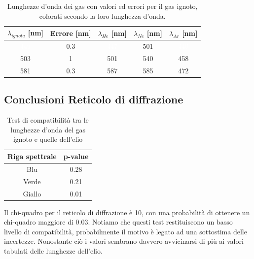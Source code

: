 \documentclass[letterpaper,12pt]{article}
\begin{document}
\begin{table}[h!]
    \centering
    \begin{tabular}{|c|c|c|c|c|}
    \hline
    \textbf{$\lambda_{ignota}$} [nm] & \textbf{Errore} [nm] & \textbf{$\lambda_{He}$} [nm] & \textbf{$\lambda_{Ne}$} [nm] & \textbf{$\lambda_{Ar}$} [nm]\\
    \hline
    \cellcolor{wavelength_449} \textcolor{white}{449} & \cellcolor{wavelength_nan}0.3 & \cellcolor{wavelength_447} \textcolor{white}{447} & \cellcolor{wavelength_501} 501 & \cellcolor{wavelength_440} \textcolor{white}{440} \\
    \hline
    \cellcolor{wavelength_503} 503 & \cellcolor{wavelength_nan}1 & \cellcolor{wavelength_501} 501 & \cellcolor{wavelength_540} 540 & \cellcolor{wavelength_458} 458 \\
    \hline
    \cellcolor{wavelength_581} 581 & \cellcolor{wavelength_nan}0.3 & \cellcolor{wavelength_587} 587 & \cellcolor{wavelength_585} 585 & \cellcolor{wavelength_472} 472 \\
    \hline
    \end{tabular}
    \caption{Lunghezze d'onda dei gas con valori ed errori per il gas ignoto, colorati secondo la loro lunghezza d'onda.}
    \label{tab:reticolo_ignoto}
\end{table}



\subsection{Conclusioni Reticolo di diffrazione}

\begin{table}[h!]
    \centering
    \begin{tabular}{|c|c|}
    \hline
    \textbf{Riga spettrale} & \textbf{p-value} \\
    \hline
    Blu & 0.28 \\
    \hline
    Verde & 0.21 \\
    \hline
    Giallo & 0.01 \\
    \hline
    \end{tabular}
    \caption{Test di compatibilità tra le lunghezze d'onda del gas ignoto e quelle dell'elio}
    \label{tab:compatibility_test}
\end{table}

Il chi-quadro per il reticolo di diffrazione è 10, con una probabilità di ottenere un chi-quadro maggiore di 0.03.
Notiamo che questi test restituiscono un basso livello di compatibilità, probabilmente
il motivo è legato ad una sottostima delle incertezze. Nonostante ciò i valori sembrano davvero
avvicinarsi di più ai valori tabulati delle lunghezze dell'elio. 
\end{document}
